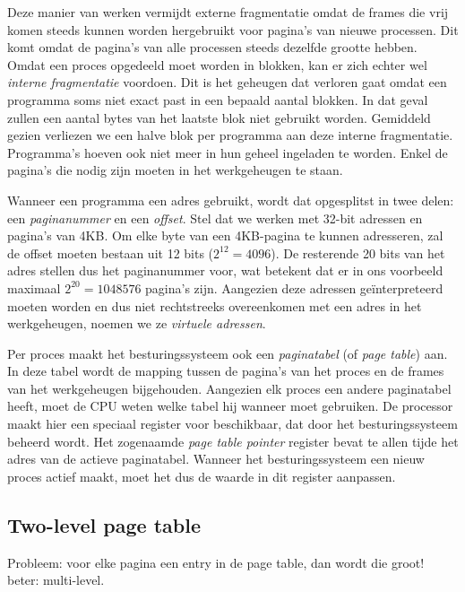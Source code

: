 
Deze manier van werken vermijdt externe fragmentatie omdat de frames die vrij komen steeds kunnen worden hergebruikt voor pagina's van nieuwe processen. Dit komt omdat de pagina's van alle processen steeds dezelfde grootte hebben. Omdat een proces opgedeeld moet worden in blokken, kan er zich echter wel \emph{interne fragmentatie} voordoen. Dit is het geheugen dat verloren gaat omdat een programma soms niet exact past in een bepaald aantal blokken. In dat geval zullen een aantal bytes van het laatste blok niet gebruikt worden. Gemiddeld gezien verliezen we een halve blok per programma aan deze interne fragmentatie. Programma's hoeven ook niet meer in hun geheel ingeladen te worden. Enkel de pagina's die nodig zijn moeten in het werkgeheugen te staan.

Wanneer een programma een adres gebruikt, wordt dat opgesplitst in twee delen: een \emph{paginanummer} en een \emph{offset}. Stel dat we werken met 32-bit adressen en pagina's van 4KB. Om elke byte van een 4KB-pagina te kunnen adresseren, zal de offset moeten bestaan uit 12 bits ($2^{12} = 4096$). De resterende 20 bits van het adres stellen dus het paginanummer voor, wat betekent dat er in ons voorbeeld maximaal $2^{20} = 1048576$ pagina's zijn. Aangezien deze adressen ge\"interpreteerd moeten worden en dus niet rechtstreeks overeenkomen met een adres in het werkgeheugen, noemen we ze \emph{virtuele adressen}.

Per proces maakt het besturingssysteem ook een \emph{paginatabel} (of \emph{page table}) aan. In deze tabel wordt de mapping tussen de pagina's van het proces en de frames van het werkgeheugen bijgehouden. Aangezien elk proces een andere paginatabel heeft, moet de CPU weten welke tabel hij wanneer moet gebruiken. De processor maakt hier een speciaal register voor beschikbaar, dat door het besturingssysteem beheerd wordt. Het zogenaamde \emph{page table pointer} register bevat te allen tijde het adres van de actieve paginatabel. Wanneer het besturingssysteem een nieuw proces actief maakt, moet het dus de waarde in dit register aanpassen.


\subsection{Two-level page table}

Probleem: voor elke pagina een entry in de page table, dan wordt die groot! beter: multi-level.

